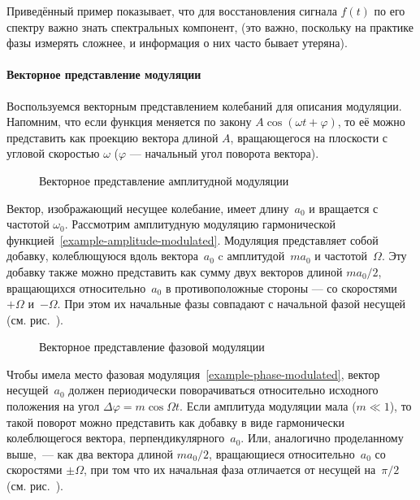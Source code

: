 Приведённый пример показывает, что для восстановления сигнала $f(t)$ по его спектру важно
знать  спектральных компонент, 
(это важно, поскольку на практике фазы измерять сложнее, и информация о
них часто бывает утеряна).

\paragraph{Векторное представление модуляции}
Воспользуемся векторным представлением колебаний для описания модуляции.
Напомним, что если функция меняется по закону $A\cos (\omega t + \varphi)$,
то её можно представить как проекцию вектора
длиной $A$, вращающегося на плоскости с угловой скоростью $\omega$
($\varphi$ --- начальный угол поворота вектора).

\begin{figure}[h!]
    \centering
    \caption{Векторное представление амплитудной модуляции}
\end{figure}
Вектор, изображающий несущее колебание, имеет длину~$a_0$
и вращается с частотой $\omega_0$.
Рассмотрим амплитудную модуляцию гармонической 
функцией~\eqref{example-amplitude-modulated}.
Модуляция представляет собой добавку, колеблющуюся вдоль 
вектора~$a_0$ c амплитудой~$ma_0$ и частотой~$\Omega$.
Эту добавку также можно представить как сумму двух векторов длиной
$ma_0/2$, вращающихся относительно~$a_0$ в противоположные стороны ---
со скоростями~$+\Omega$ и~$-\Omega$. При этом их начальные фазы совпадают
с начальной фазой несущей (см. рис.~).

\begin{figure}[h!]
    \centering
    \caption{Векторное представление фазовой модуляции}
\end{figure}

Чтобы имела место фазовая модуляция~\eqref{example-phase-modulated},
вектор несущей~$a_0$ должен периодически поворачиваться относительно 
исходного положения на угол $\Delta \varphi = m\cos \Omega t$. 
Если амплитуда модуляции мала ($m\ll 1$), то такой поворот можно представить 
как добавку в виде гармонически колеблющегося вектора, перпендикулярного~$a_0$. 
Или, аналогично проделанному выше,~--- как 
два вектора длиной $ma_0/2$, вращающиеся относительно~$a_0$ 
со скоростями $\pm\Omega$, при том что их начальная фаза отличается от несущей
на~$\pi/2$ (см. рис.~).

